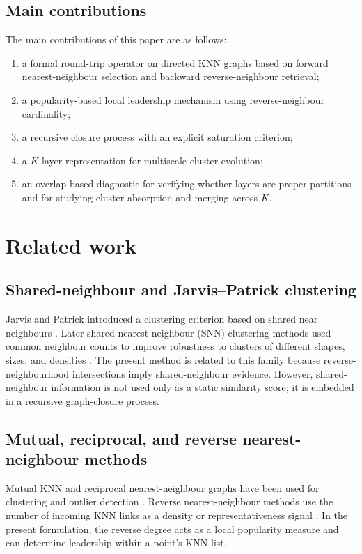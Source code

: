 \documentclass[pdflatex,sn-mathphys-num]{sn-jnl}
\begin{document}
\subsection{Main contributions}

The main contributions of this paper are as follows:
\begin{enumerate}
\item a formal round-trip operator on directed KNN graphs based on forward nearest-neighbour selection and backward reverse-neighbour retrieval;
\item a popularity-based local leadership mechanism using reverse-neighbour cardinality;
\item a recursive closure process with an explicit saturation criterion;
\item a $K$-layer representation for multiscale cluster evolution;
\item an overlap-based diagnostic for verifying whether layers are proper partitions and for studying cluster absorption and merging across $K$.
\end{enumerate}

\section{Related work}\label{sec:related}

\subsection{Shared-neighbour and Jarvis--Patrick clustering}

Jarvis and Patrick introduced a clustering criterion based on shared near neighbours \citep{JarvisPatrick1973}. Later shared-nearest-neighbour (SNN) clustering methods used common neighbour counts to improve robustness to clusters of different shapes, sizes, and densities \citep{ErtozSteinbachKumar2003}. The present method is related to this family because reverse-neighbourhood intersections imply shared-neighbour evidence. However, shared-neighbour information is not used only as a static similarity score; it is embedded in a recursive graph-closure process.

\subsection{Mutual, reciprocal, and reverse nearest-neighbour methods}

Mutual KNN and reciprocal nearest-neighbour graphs have been used for clustering and outlier detection \citep{BritoChavezQuirozYukich1997,GowdaKrishna1978,SardanaBhatnagar2014}. Reverse nearest-neighbour methods use the number of incoming KNN links as a density or representativeness signal \citep{ChowdhuryAmorim2018}. In the present formulation, the reverse degree acts as a local popularity measure and can determine leadership within a point's KNN list.
\end{document}

